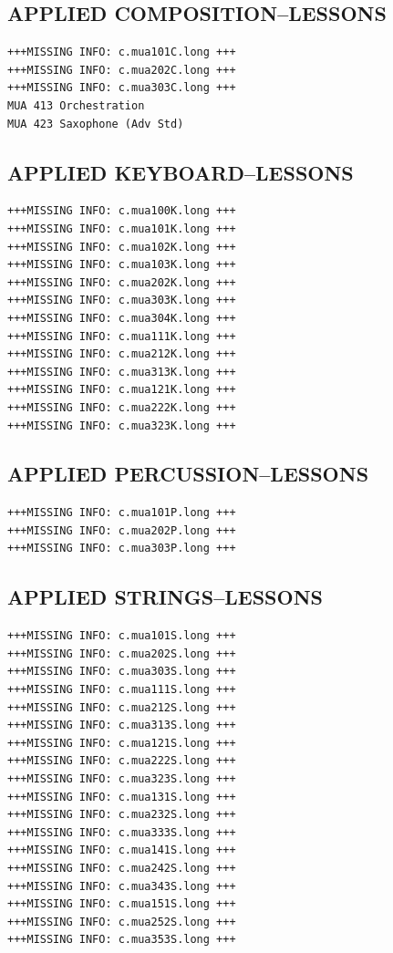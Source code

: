 \documentclass[
  letterpaper,
]{scrbook}
\begin{document}
\hypertarget{applied-compositionlessons}{%
\subsection{APPLIED
COMPOSITION--LESSONS}\label{applied-compositionlessons}}

\begin{verbatim}
+++MISSING INFO: c.mua101C.long +++
+++MISSING INFO: c.mua202C.long +++
+++MISSING INFO: c.mua303C.long +++
MUA 413 Orchestration
MUA 423 Saxophone (Adv Std)
\end{verbatim}

\hypertarget{applied-keyboardlessons}{%
\subsection{APPLIED KEYBOARD--LESSONS}\label{applied-keyboardlessons}}

\begin{verbatim}
+++MISSING INFO: c.mua100K.long +++
+++MISSING INFO: c.mua101K.long +++
+++MISSING INFO: c.mua102K.long +++
+++MISSING INFO: c.mua103K.long +++
+++MISSING INFO: c.mua202K.long +++
+++MISSING INFO: c.mua303K.long +++
+++MISSING INFO: c.mua304K.long +++
+++MISSING INFO: c.mua111K.long +++
+++MISSING INFO: c.mua212K.long +++
+++MISSING INFO: c.mua313K.long +++
+++MISSING INFO: c.mua121K.long +++
+++MISSING INFO: c.mua222K.long +++
+++MISSING INFO: c.mua323K.long +++
\end{verbatim}

\hypertarget{applied-percussionlessons}{%
\subsection{APPLIED
PERCUSSION--LESSONS}\label{applied-percussionlessons}}

\begin{verbatim}
+++MISSING INFO: c.mua101P.long +++
+++MISSING INFO: c.mua202P.long +++
+++MISSING INFO: c.mua303P.long +++
\end{verbatim}

\hypertarget{applied-stringslessons}{%
\subsection{APPLIED STRINGS--LESSONS}\label{applied-stringslessons}}

\begin{verbatim}
+++MISSING INFO: c.mua101S.long +++
+++MISSING INFO: c.mua202S.long +++
+++MISSING INFO: c.mua303S.long +++
+++MISSING INFO: c.mua111S.long +++
+++MISSING INFO: c.mua212S.long +++
+++MISSING INFO: c.mua313S.long +++
+++MISSING INFO: c.mua121S.long +++
+++MISSING INFO: c.mua222S.long +++
+++MISSING INFO: c.mua323S.long +++
+++MISSING INFO: c.mua131S.long +++
+++MISSING INFO: c.mua232S.long +++
+++MISSING INFO: c.mua333S.long +++
+++MISSING INFO: c.mua141S.long +++
+++MISSING INFO: c.mua242S.long +++
+++MISSING INFO: c.mua343S.long +++
+++MISSING INFO: c.mua151S.long +++
+++MISSING INFO: c.mua252S.long +++
+++MISSING INFO: c.mua353S.long +++
\end{verbatim}
\end{document}
